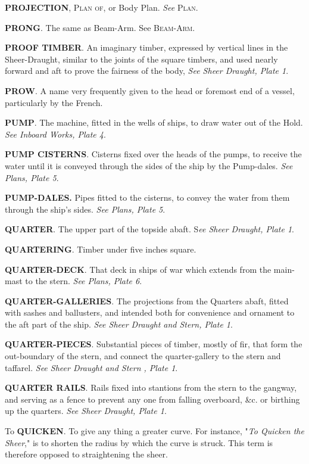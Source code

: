 \textbf{PROJECTION}, \textsc{Plan of}, or Body Plan. \textit{See} \textsc{Plan}. 

\textbf{PRONG}. The same as Beam-Arm. See \textsc{Beam-Arm}. 

\textbf{PROOF TIMBER}. An imaginary timber, expressed by vertical lines in the Sheer-Draught, similar to the joints of the square timbers, and used nearly forward and aft to prove the fairness of the body, \textit{See Sheer Draught, Plate 1}. 

\textbf{PROW}. A name very frequently given to the head or foremost end of a vessel, particularly by the French.

\textbf{PUMP}. The machine, fitted in the wells of ships, to draw water out of the Hold. \textit{See Inboard Works, Plate 4}. 

\textbf{PUMP CISTERNS}. Cisterns fixed over the heads of the pumps, to receive the water until it is conveyed through the sides of the ship by the Pump-dales. \textit{See Plans, Plate 5}. 

\textbf{PUMP-DALES.} Pipes fitted to the cisterns, to convey the water from them through the ship’s sides. \textit{See Plans, Plate 5}. 

\textbf{QUARTER}. The upper part of the topside abaft. S\textit{ee Sheer Draught, Plate 1}. 

\textbf{QUARTERING}. Timber under five inches square. 

\textbf{QUARTER-DECK}. That deck in ships of war which extends from the main-mast to the stern. \textit{See Plans, Plate 6}.

\textbf{QUARTER-GALLERIES}. The projections from the Quarters abaft, fitted with sashes and ballusters, and intended both for convenience and ornament to the aft part of the ship. \textit{See Sheer Draught and Stern, Plate 1}. 

\textbf{QUARTER-PIECES}. Substantial pieces of timber, mostly of fir, that form the out-boundary of the stern, and connect the quarter-gallery to the stern and taffarel. \textit{See Sheer Draught and Stern , Plate 1}. 

\textbf{QUARTER RAILS}. Rails fixed into stantions from the stern to the gangway, and serving as a fence to prevent any one from falling overboard, \&c. or birthing up the quarters. \textit{See Sheer Draught, Plate 1}. 

To \textbf{QUICKEN}. To give any thing a greater curve. For instance, "\textit{To Quicken the Sheer}," is to shorten the radius by which the curve is struck. This term is therefore opposed to straightening the sheer. 

